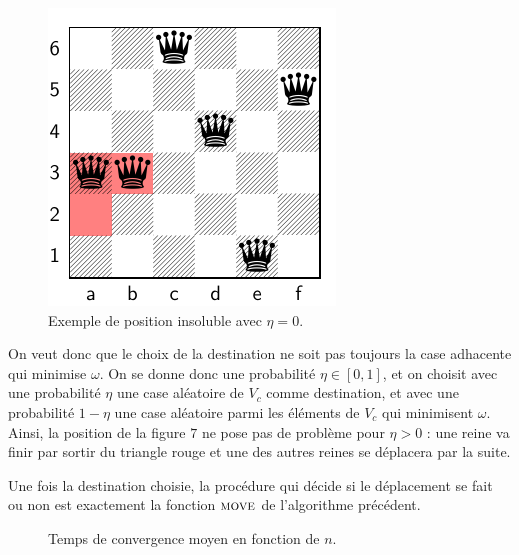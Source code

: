 \documentclass[11pt, openany]{article}
\newcommand{\M}{\textsc{move}}
\begin{document}

\begin{figure}[scale=0.85]
\centering

\includegraphics{fig7_scissored.pdf}

\caption{Exemple de position insoluble avec $\eta=0$.}
\end{figure}

\medskip

On veut donc que le choix de la destination ne soit pas toujours la case adhacente qui minimise $\omega$. On se donne donc une probabilité $\eta \in [0,1]$, et on choisit avec une probabilité $\eta$ une case aléatoire de $V_c$ comme destination, et avec une probabilité $1 - \eta$ une case aléatoire parmi les éléments de $V_c$ qui minimisent $\omega$. Ainsi, la position de la figure $7$ ne pose pas de problème pour $\eta > 0$ : une reine va finir par sortir du triangle rouge et une des autres reines se déplacera par la suite.

Une fois la destination choisie, la procédure qui décide si le déplacement se fait ou non est exactement la fonction $\M$ de l'algorithme précédent.

\bigskip

\begin{figure}
  \centering
  \caption{Temps de convergence moyen en fonction de $n$.}
\end{figure}  
\end{document}
